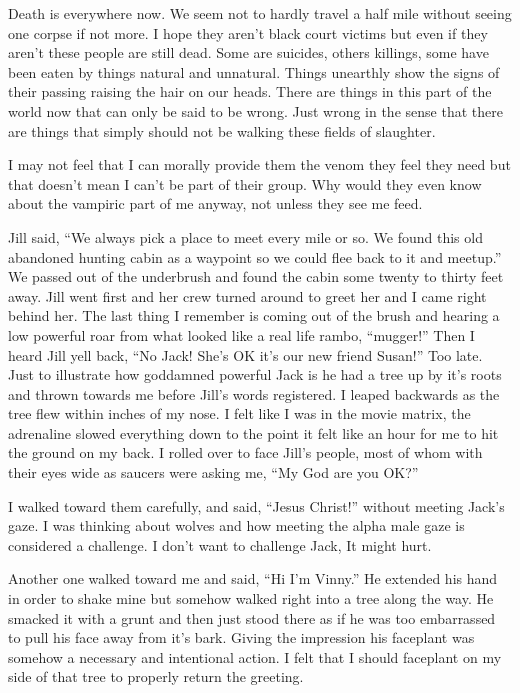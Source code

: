 Death is everywhere now. We seem not to hardly travel a half mile without seeing one corpse if not more. I hope they aren't black court victims but even if they aren't these people are still dead. Some are suicides, others killings, some have been eaten by things natural and unnatural. Things unearthly show the signs of their passing raising the hair on our heads. There are things in this part of the world now that can only be said to be wrong. Just wrong in the sense that there are things that simply should not be walking these fields of slaughter. 

I may not feel that I can morally provide them the venom they feel they need but that doesn't mean I can't be part of their group. Why would they even know about the vampiric part of me anyway, not unless they see me feed. 

Jill said, ``We always pick a place to meet every mile or so. We found this old abandoned hunting cabin as a waypoint so we could flee back to it and meetup.'' We passed out of the underbrush and found the cabin some twenty to thirty feet away. Jill went first and her crew turned around to greet her and I came right behind her. The last thing I remember is coming out of the brush and hearing a low powerful roar from what looked like a real life rambo, ``mugger!'' Then I heard Jill yell back, ``No Jack! She's OK it's our new friend Susan!'' Too late. Just to illustrate how goddamned powerful Jack is he had a tree up by it's roots and thrown towards me before Jill's words registered. I leaped backwards as the tree flew within inches of my nose. I felt like I was in the movie matrix, the adrenaline slowed everything down to the point it felt like an hour for me to hit the ground on my back. I rolled over to face Jill's people, most of whom with their eyes wide as saucers were asking me, ``My God are you OK?''

I walked toward them carefully, and said, ``Jesus Christ!'' without meeting Jack's gaze. I was thinking about wolves and how meeting the alpha male gaze is considered a challenge. I don't want to challenge Jack, It might hurt.

Another one walked toward me and said, ``Hi I'm Vinny.'' He extended his hand in order to shake mine but somehow walked right into a tree along the way. He smacked it with a grunt and then just stood there as if he was too embarrassed to pull his face away from it's bark. Giving the impression his faceplant was somehow a necessary and intentional action. I felt that I should faceplant on my side of that tree to properly return the greeting.


